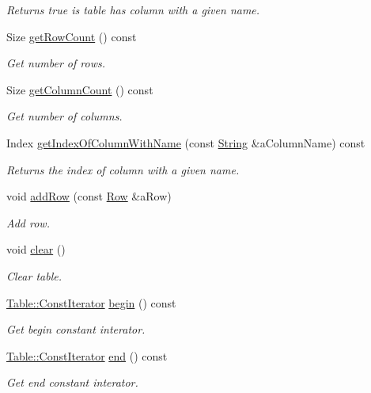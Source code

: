 \begin{DoxyCompactItemize}
\begin{DoxyCompactList}\small\item\em Returns true is table has column with a given name. \end{DoxyCompactList}\item 
Size \mbox{\hyperlink{classlibrary_1_1core_1_1ctnr_1_1_table_a18036491993fea84dd2a595e7703258f}{get\+Row\+Count}} () const
\begin{DoxyCompactList}\small\item\em Get number of rows. \end{DoxyCompactList}\item 
Size \mbox{\hyperlink{classlibrary_1_1core_1_1ctnr_1_1_table_af725ea46d4737e1c3d0d8ad5a4dda733}{get\+Column\+Count}} () const
\begin{DoxyCompactList}\small\item\em Get number of columns. \end{DoxyCompactList}\item 
Index \mbox{\hyperlink{classlibrary_1_1core_1_1ctnr_1_1_table_a6144fd9e6f0e18bb17f457a32ab3c027}{get\+Index\+Of\+Column\+With\+Name}} (const \mbox{\hyperlink{classlibrary_1_1core_1_1types_1_1_string}{String}} \&a\+Column\+Name) const
\begin{DoxyCompactList}\small\item\em Returns the index of column with a given name. \end{DoxyCompactList}\item 
void \mbox{\hyperlink{classlibrary_1_1core_1_1ctnr_1_1_table_a9c9b8b7a2eca260d58b721c4f465a7d3}{add\+Row}} (const \mbox{\hyperlink{classlibrary_1_1core_1_1ctnr_1_1table_1_1_row}{Row}} \&a\+Row)
\begin{DoxyCompactList}\small\item\em Add row. \end{DoxyCompactList}\item 
void \mbox{\hyperlink{classlibrary_1_1core_1_1ctnr_1_1_table_a82b89b7d22f40518054f6d507660e8b5}{clear}} ()
\begin{DoxyCompactList}\small\item\em Clear table. \end{DoxyCompactList}\item 
\mbox{\hyperlink{classlibrary_1_1core_1_1ctnr_1_1_table_a7fa78ad4e7e8d27ceab0bff51ab84fc3}{Table\+::\+Const\+Iterator}} \mbox{\hyperlink{classlibrary_1_1core_1_1ctnr_1_1_table_ad9a420d9759797e8e8d9142da502a6c8}{begin}} () const
\begin{DoxyCompactList}\small\item\em Get begin constant interator. \end{DoxyCompactList}\item 
\mbox{\hyperlink{classlibrary_1_1core_1_1ctnr_1_1_table_a7fa78ad4e7e8d27ceab0bff51ab84fc3}{Table\+::\+Const\+Iterator}} \mbox{\hyperlink{classlibrary_1_1core_1_1ctnr_1_1_table_af1aadfb47df33ffa4f611f571d52bd89}{end}} () const
\begin{DoxyCompactList}\small\item\em Get end constant interator. \end{DoxyCompactList}\end{DoxyCompactItemize}
